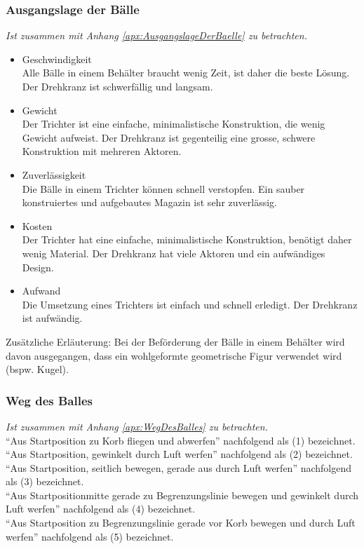 		\subsubsection{Ausgangslage der Bälle}
			\textit{Ist zusammen mit Anhang \ref{apx:AusgangslageDerBaelle} zu betrachten.}
			\begin{itemize}
				\item Geschwindigkeit\\
				Alle Bälle in einem Behälter braucht wenig Zeit, ist daher die beste Lösung. Der Drehkranz ist schwerfällig und langsam.
				\item Gewicht\\
				Der Trichter ist eine einfache, minimalistische Konstruktion, die wenig Gewicht aufweist. Der Drehkranz ist gegenteilig eine grosse, schwere Konstruktion mit mehreren Aktoren.
				\item Zuverlässigkeit\\
				Die Bälle in einem Trichter können schnell verstopfen. Ein sauber konstruiertes und aufgebautes Magazin ist sehr zuverlässig. 
				\item Kosten\\
				Der Trichter hat eine einfache, minimalistische Konstruktion, benötigt daher wenig Material. Der Drehkranz hat viele Aktoren und ein aufwändiges Design.
				\item Aufwand\\
				Die Umsetzung eines Trichters ist einfach und schnell erledigt. Der Drehkranz ist aufwändig.					
			\end{itemize}
			Zusätzliche Erläuterung: Bei der Beförderung der Bälle in einem Behälter wird davon ausgegangen, dass ein wohlgeformte geometrische Figur verwendet wird (bspw. Kugel).
			
			
		\subsubsection{Weg des Balles}
		\textit{Ist zusammen mit Anhang \ref{apx:WegDesBalles} zu betrachten.}\\		
		\enquote{Aus Startposition zu Korb fliegen und abwerfen} nachfolgend als (1) bezeichnet.\\	
		\enquote{Aus Startposition, gewinkelt durch Luft werfen} nachfolgend als (2) bezeichnet.\\
		\enquote{Aus Startposition, seitlich bewegen, gerade aus durch Luft werfen} nachfolgend als (3) bezeichnet.\\
		\enquote{Aus Startpositionmitte gerade zu Begrenzungslinie bewegen und gewinkelt durch Luft werfen} nachfolgend als (4) bezeichnet.\\
		\enquote{Aus Startposition zu Begrenzungslinie gerade vor Korb bewegen und durch Luft werfen} nachfolgend als (5) bezeichnet.\\	
		
